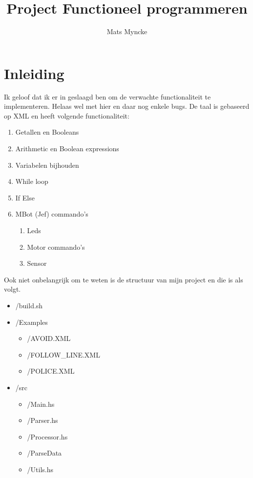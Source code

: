 \documentclass[]{article}
\begin{document}
\title{Project Functioneel programmeren}
\author{Mats Myncke}
\maketitle

\newpage


\newpage
\section{Inleiding}
Ik geloof dat ik er in geslaagd ben om de verwachte functionaliteit te implementeren. Helaas wel met hier en daar nog enkele bugs. De taal is gebaseerd op XML en heeft volgende functionaliteit:

\begin{enumerate}
\item Getallen en Booleans
\item Arithmetic en Boolean expressions
\item Variabelen bijhouden
\item  While loop
\item If Else
\item MBot (Jef) commando's
	\begin{enumerate}
	\item Leds
	\item Motor commando's
	\item Sensor ~
	\end{enumerate}
\end{enumerate}

Ook niet  onbelangrijk om te weten is de structuur van mijn project en die is als volgt. 
\begin{itemize}
\item /build.sh
\item /Examples
	\begin{itemize}
	\item /AVOID.XML
	\item /FOLLOW\_LINE.XML
	\item /POLICE.XML
	\end{itemize}
\item /src
	\begin{itemize}
	\item /Main.hs
	\item /Parser.hs
	\item /Processor.hs
	\item /ParseData
	\item /Utils.hs
	\end{itemize}
\end{itemize}
\end{document}
